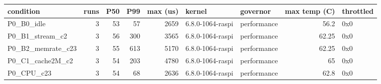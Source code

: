 \begin{tabular}{lrrrrllrl}
\toprule
condition & runs & P50 & P99 & max (us) & kernel & governor & max temp (C) & throttled \\
\midrule
P0\_B0\_idle & 3 & 53 & 57 & 2659 & 6.8.0-1064-raspi & performance & 56.2 & 0x0 \\
P0\_B1\_stream\_c2 & 3 & 56 & 300 & 3565 & 6.8.0-1064-raspi & performance & 62.25 & 0x0 \\
P0\_B2\_memrate\_c23 & 3 & 55 & 613 & 5170 & 6.8.0-1064-raspi & performance & 62.25 & 0x0 \\
P0\_C1\_cache2M\_c2 & 3 & 54 & 203 & 4780 & 6.8.0-1064-raspi & performance & 65 & 0x0 \\
P0\_CPU\_c23 & 3 & 54 & 68 & 2636 & 6.8.0-1064-raspi & performance & 62.8 & 0x0 \\
\bottomrule
\end{tabular}
